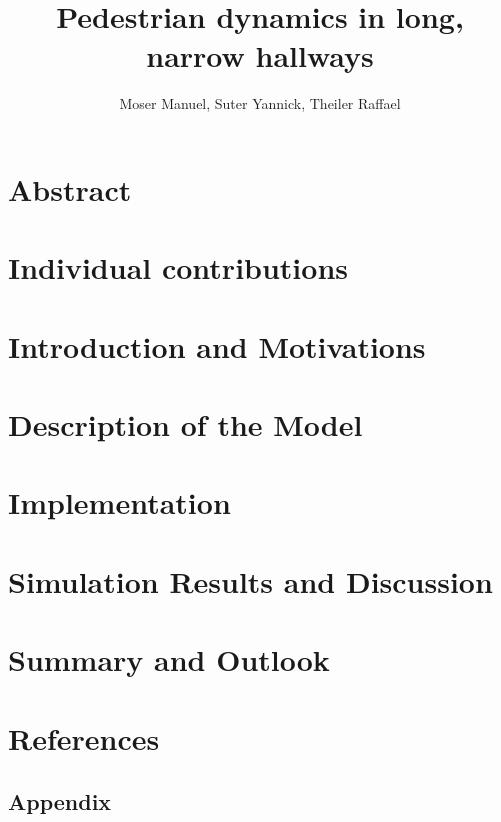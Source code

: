\documentclass[11pt]{article}
\title{Pedestrian dynamics in long, narrow hallways}
\author{Moser Manuel, Suter Yannick, Theiler Raffael}
\begin{document}

\newpage





\tableofcontents
\newpage


\section{Abstract}


\section{Individual contributions}


\section{Introduction and Motivations}


\section{Description of the Model}

\newpage

\section{Implementation}

\newpage

\section{Simulation Results and Discussion}

\newpage

\section{Summary and Outlook}


\section{References}


\newpage


\newpage
\begin{appendix}
\section{Appendix}

\end{appendix}



\end{document}
